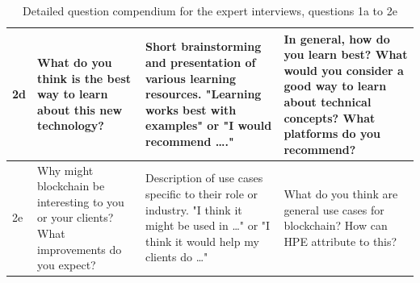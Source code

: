 \begin{table}[H]
\begin{tabular}{ | p{0.7cm} P{2.6cm} p{5cm} p{6cm}|}
	2d & What do you think is the best way to learn about this new technology?  & Short brainstorming and presentation of various learning resources. "Learning works best with examples" or "I would recommend …." & In general, how do you learn best? What would you consider a good way to learn about technical concepts? What platforms do you recommend?  \\ \hline
	2e & Why might blockchain be interesting to you or your clients? What improvements do you expect?  & Description of use cases specific to their role or industry. "I think it might be used in …" or "I think it would help my clients do …" & What do you think are general use cases for blockchain? How can HPE attribute to this? \\\hline
    \end{tabular}
    \caption{Detailed question compendium for the expert interviews, questions 1a to 2e}
    \label{tab:QuestionCompendiumDetailed}
\end{table}

